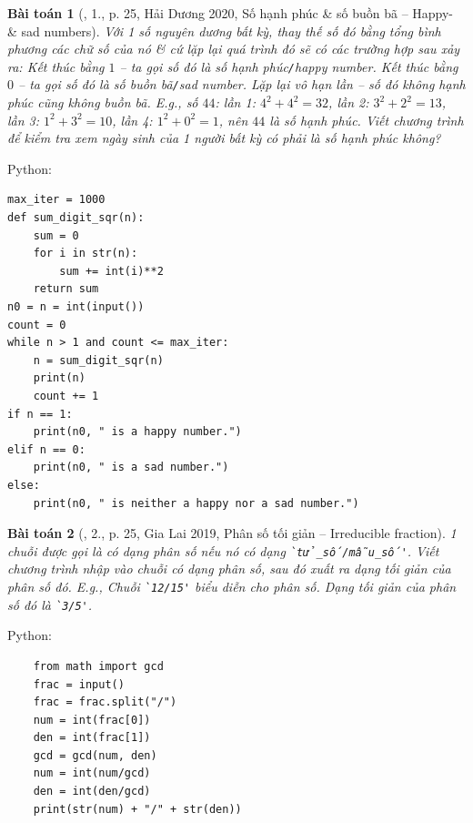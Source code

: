 \documentclass{article}
\newtheorem{baitoan}{Bài toán}
\begin{document}
\begin{baitoan}[\cite{VietSTEM2021}, 1., p. 25, Hải Dương 2020, Số hạnh phúc \& số buồn bã -- Happy- \& sad numbers]
	Với 1 số nguyên dương bất kỳ, thay thế số đó bằng tổng bình phương các chữ số của nó \& cứ lặp lại quá trình đó sẽ có các trường hợp sau xảy ra: Kết thúc bằng $1$ -- ta gọi số đó là \emph{số hạnh phúc\texttt{/}happy number}. Kết thúc bằng $0$ -- ta gọi số đó là \emph{số buồn bã\texttt{/}sad number}. Lặp lại vô hạn lần -- số đó không hạnh phúc cũng không buồn bã. E.g., số $44$: lần 1: $4^2 + 4^2 = 32$, lần 2: $3^2 + 2^2 = 13$, lần 3: $1^2 + 3^2 = 10$, lần 4: $1^2 + 0^2 = 1$, nên $44$ là số hạnh phúc. Viết chương trình để kiểm tra xem ngày sinh của 1 người bất kỳ có phải là số hạnh phúc không?
\end{baitoan}
Python:
\begin{verbatim}
max_iter = 1000
def sum_digit_sqr(n):
    sum = 0 
    for i in str(n):
        sum += int(i)**2
    return sum
n0 = n = int(input())
count = 0
while n > 1 and count <= max_iter:
    n = sum_digit_sqr(n)
    print(n)
    count += 1
if n == 1:
    print(n0, " is a happy number.")
elif n == 0:
    print(n0, " is a sad number.")
else:
    print(n0, " is neither a happy nor a sad number.")
\end{verbatim}

\begin{baitoan}[\cite{VietSTEM2021}, 2., p. 25, Gia Lai 2019, Phân số tối giản -- Irreducible fraction]
	1 chuỗi được gọi là có dạng phân số nếu nó có dạng \verb|`tử_số/mẫu_số'|. Viết chương trình nhập vào chuỗi có dạng phân số, sau đó xuất ra dạng tối giản của phân số đó. E.g., Chuỗi \verb|`12/15'| biểu diễn cho phân số. Dạng tối giản của phân số đó là \verb|`3/5'|.
\end{baitoan}
Python:
\begin{verbatim}
	from math import gcd
	frac = input()
	frac = frac.split("/")
	num = int(frac[0])
	den = int(frac[1])
	gcd = gcd(num, den)
	num = int(num/gcd)
	den = int(den/gcd)
	print(str(num) + "/" + str(den))
\end{verbatim}
\end{document}
